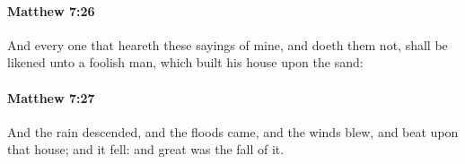 		\paragraph{Matthew 7:26} %
			\label{MATTHEW-7-26}

			And every one that heareth these sayings of mine, and doeth them not, shall be likened unto a foolish man, which built his house upon the sand:

			\begin{framed}
			\scriptsize
				\begin{compactdesc}
					\item[SBLG] 
				\end{compactdesc}
			\end{framed}

		\paragraph{Matthew 7:27} %
			\label{MATTHEW-7-27}

			And the rain descended, and the floods came, and the winds blew, and beat upon that house; and it fell: and great was the fall of it.

